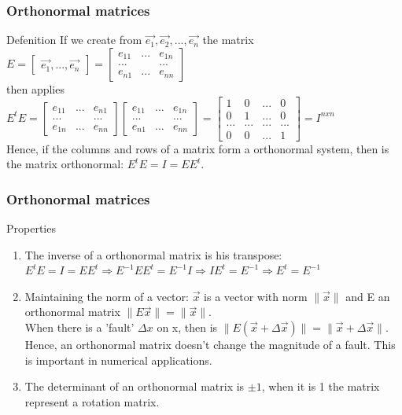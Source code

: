 \begin{frame}
	\frametitle{Orthonormal matrices}
	\begin{block}{Defenition}
		If we create from $\overrightarrow{e_1},\overrightarrow{e_2},...,\overrightarrow{e_n}$ the matrix \\
		$E=\begin{bmatrix} \overrightarrow{e_1},...,\overrightarrow{e_n}\end{bmatrix}=\begin{bmatrix} 
		e_{11} & ... & e_{1n}\\
		... & & ...\\
		e_{n1} & ... & e_{nn}\end{bmatrix}$ \\
		then applies\\
		$E^tE=\begin{bmatrix} 
		e_{11} & ... & e_{n1}\\
		... & & ...\\
		e_{1n} & ... & e_{nn}\end{bmatrix}\begin{bmatrix} 
		e_{11} & ... & e_{1n}\\
		... & & ...\\
		e_{n1} & ... & e_{nn}\end{bmatrix}=\begin{bmatrix} 
		1 & 0 & ... & 0\\
		0 & 1 & ... & 0\\
		... & ... & ... & ...\\
		0 & 0 & ... & 1\end{bmatrix}=I^{nxn}$\\
		Hence, if the columns and rows of a matrix form a orthonormal system, then is the matrix orthonormal: $E^tE=I=EE^t$.
	\end{block}
\end{frame}

\begin{frame}
	\frametitle{Orthonormal matrices}
	\begin{block}{Properties}
		\begin{enumerate}
			\item The inverse of a orthonormal matrix is his transpose:\\
			$E^tE=I=EE^t \Rightarrow E^{-1}EE^t=E^{-1}I \Rightarrow IE^t=E^{-1} \Rightarrow E^t=E^{-1}$
			\item Maintaining the norm of a vector: $\overrightarrow{x}$ is a vector with norm $\|\overrightarrow{x}\|$ and E an orthonormal matrix $\|E\overrightarrow{x}\|=\|\overrightarrow{x}\|$.\\
			When there is a 'fault' $\Delta x$ on x, then is $\|E(\overrightarrow{x}+\Delta\overrightarrow{x})\|=\|\overrightarrow{x}+\Delta\overrightarrow{x}\|$.\\
			Hence, an orthonormal matrix doesn't change the magnitude of a fault. This is important in numerical applications.
			\item The determinant of an orthonormal matrix is $\pm1$, when it is 1 the matrix represent a rotation matrix.
		\end{enumerate}
	\end{block}
\end{frame}

